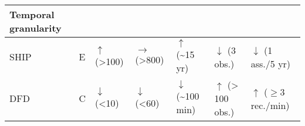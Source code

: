 \documentclass[
]{book}
\begin{document}
\begin{longtable}[]{@{}lllllll@{}}
\begin{minipage}[b]{0.13\columnwidth}
Temporal granularity\strut
\end{minipage}\tabularnewline
\midrule
\endhead
\begin{minipage}[t]{0.08\columnwidth}\raggedright
SHIP\strut
\end{minipage} & \begin{minipage}[t]{0.05\columnwidth}\raggedright
E\strut
\end{minipage} & \begin{minipage}[t]{0.13\columnwidth}\raggedright
\(\uparrow\) (\textgreater100)\strut
\end{minipage} & \begin{minipage}[t]{0.13\columnwidth}\raggedright
\(\rightarrow\) (\textgreater800)\strut
\end{minipage} & \begin{minipage}[t]{0.13\columnwidth}\raggedright
\(\uparrow\) (\textasciitilde15 yr)\strut
\end{minipage} & \begin{minipage}[t]{0.13\columnwidth}\raggedright
\(\downarrow\) (3 obs.)\strut
\end{minipage} & \begin{minipage}[t]{0.13\columnwidth}\raggedright
\(\downarrow\) (1 ass./5 yr)\strut
\end{minipage}\tabularnewline
\begin{minipage}[t]{0.08\columnwidth}\raggedright
DFD\strut
\end{minipage} & \begin{minipage}[t]{0.05\columnwidth}\raggedright
C\strut
\end{minipage} & \begin{minipage}[t]{0.13\columnwidth}\raggedright
\(\downarrow\) (\textless10)\strut
\end{minipage} & \begin{minipage}[t]{0.13\columnwidth}\raggedright
\(\downarrow\) (\textless60)\strut
\end{minipage} & \begin{minipage}[t]{0.13\columnwidth}\raggedright
\(\downarrow\) (\textasciitilde100 min)\strut
\end{minipage} & \begin{minipage}[t]{0.13\columnwidth}\raggedright
\(\uparrow\) (\textgreater{} 100 obs.)\strut
\end{minipage} & \begin{minipage}[t]{0.13\columnwidth}\raggedright
\(\uparrow\) (\(\geq 3\) rec./min)\strut
\end{minipage}\tabularnewline

\end{longtable}
\end{document}
